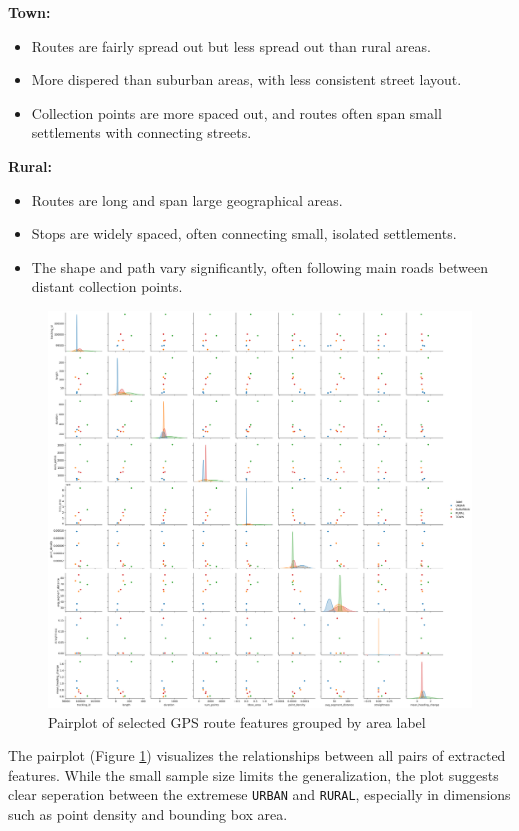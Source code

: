 \documentclass[a4paper,12pt,twoside]{scrreprt}
\begin{document}
\textbf{Town:}
\begin{itemize}
  \item Routes are fairly spread out but less spread out than rural areas.
  \item More dispered than suburban areas, with less consistent street layout.
  \item Collection points are more spaced out, and routes often span small
        settlements with connecting streets.
\end{itemize}

\textbf{Rural:}
\begin{itemize}
  \item Routes are long and span large geographical areas.
  \item Stops are widely spaced, often connecting small, isolated settlements.
  \item The shape and path vary significantly, often following main roads
        between distant collection points.
\end{itemize}

\begin{figure}[htbp]
  \centering
  \includegraphics[width=\textwidth]{Figures/sample_pairplot.png}
  \caption{Pairplot of selected GPS route features grouped by area label}
  \label{fig:sample_pairplot}
\end{figure}
\FloatBarrier

The pairplot (Figure \ref{fig:sample_pairplot}) visualizes the relationships
between all pairs of extracted features.
While the small sample size limits the generalization, the plot suggests clear
seperation between the extremese \texttt{URBAN} and \texttt{RURAL}, especially
in dimensions such as point density and bounding box area.
\end{document}
